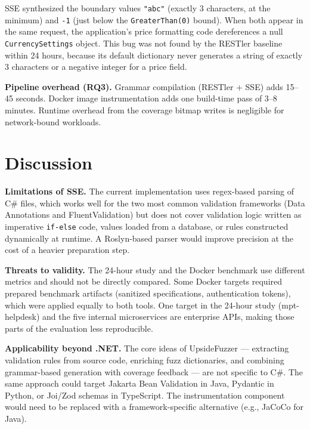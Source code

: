 \documentclass[conference]{IEEEtran}
\begin{document}
SSE synthesized the boundary values \texttt{"abc"} (exactly 3 characters, at the minimum) and \texttt{-1} (just below the \texttt{GreaterThan(0)} bound). When both appear in the same request, the application's price formatting code dereferences a null \texttt{CurrencySettings} object. This bug was not found by the RESTler baseline within 24 hours, because its default dictionary never generates a string of exactly 3 characters or a negative integer for a price field.

\textbf{Pipeline overhead (RQ3).} Grammar compilation (RESTler + SSE) adds 15--45 seconds. Docker image instrumentation adds one build-time pass of 3--8 minutes. Runtime overhead from the coverage bitmap writes is negligible for network-bound workloads.

\section{Discussion}
\label{sec:discussion}

\textbf{Limitations of SSE.} The current implementation uses regex-based parsing of C\# files, which works well for the two most common validation frameworks (Data Annotations and FluentValidation) but does not cover validation logic written as imperative \texttt{if-else} code, values loaded from a database, or rules constructed dynamically at runtime. A Roslyn-based parser would improve precision at the cost of a heavier preparation step.

\textbf{Threats to validity.} The 24-hour study and the Docker benchmark use different metrics and should not be directly compared. Some Docker targets required prepared benchmark artifacts (sanitized specifications, authentication tokens), which were applied equally to both tools. One target in the 24-hour study (mpt-helpdesk) and the five internal microservices are enterprise APIs, making those parts of the evaluation less reproducible.

\textbf{Applicability beyond .NET.} The core ideas of UpsideFuzzer --- extracting validation rules from source code, enriching fuzz dictionaries, and combining grammar-based generation with coverage feedback --- are not specific to C\#. The same approach could target Jakarta Bean Validation in Java, Pydantic in Python, or Joi/Zod schemas in TypeScript. The instrumentation component would need to be replaced with a framework-specific alternative (e.g., JaCoCo for Java).
\end{document}
